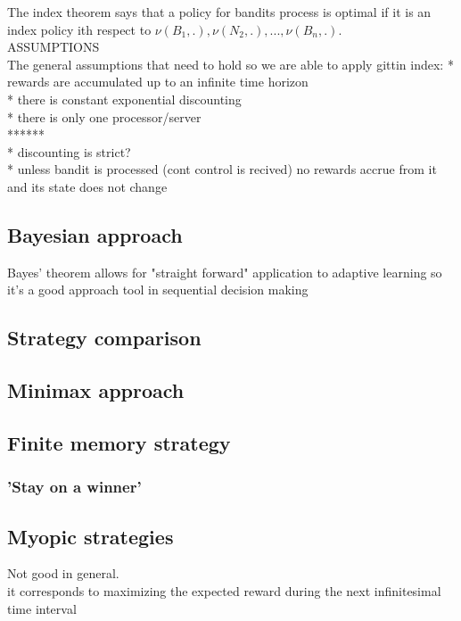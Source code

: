 \documentclass[12pt, a4paper, pdflatex, leqno]{report}
\begin{document}
The index theorem says that a policy for bandits process is optimal if it is an index policy ith respect to $\nu(B_1, .), \nu(N_2, .), ... , \nu(B_n, .)$.\\


ASSUMPTIONS\\
The general assumptions that need to hold so we are able to apply gittin index:
* rewards are accumulated up to an infinite time horizon\\
* there is constant exponential discounting\\
* there is only one processor/server\\
******\\
* discounting is strict?\\
* unless bandit is processed (cont control is recived) no rewards accrue from it and its state does not change\\

\subsection{Bayesian approach}
Bayes' theorem allows for "straight forward" application to adaptive learning so it's a good approach tool in sequential decision making 

\subsection{Strategy comparison}

\subsection{Minimax approach}

\subsection{Finite memory strategy}
\subsubsection{'Stay on a winner'}

\subsection{Myopic strategies}
Not good in general.\\

it corresponds to maximizing the expected reward during the next infinitesimal time interval
\end{document}
